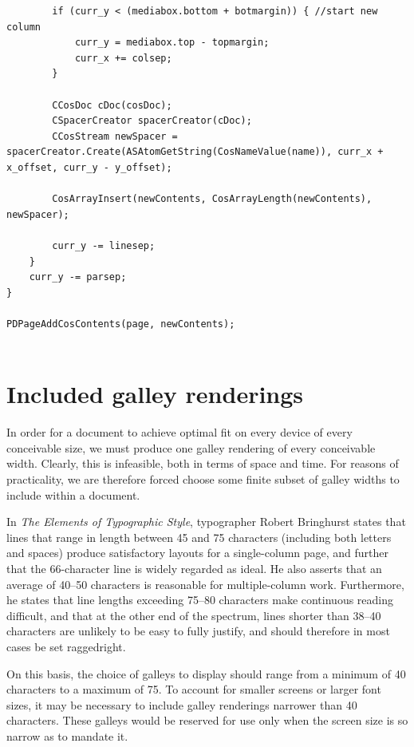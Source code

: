 \begin{lstlisting}
        if (curr_y < (mediabox.bottom + botmargin)) { //start new column
            curr_y = mediabox.top - topmargin;
            curr_x += colsep;
        }
        
        CCosDoc cDoc(cosDoc);
        CSpacerCreator spacerCreator(cDoc);
        CCosStream newSpacer = spacerCreator.Create(ASAtomGetString(CosNameValue(name)), curr_x + x_offset, curr_y - y_offset);
        
        CosArrayInsert(newContents, CosArrayLength(newContents), newSpacer);
        
        curr_y -= linesep;
    }
    curr_y -= parsep;
}

PDPageAddCosContents(page, newContents);


\end{lstlisting}


\section{Included galley renderings}
\label{sec:inc-renderings}
In order for a document to achieve optimal fit on every device of every conceivable size, we must produce one galley rendering of every conceivable width. Clearly, this is infeasible, both in terms of space and time. For reasons of practicality, we are therefore forced choose some finite subset of galley widths to include within a document.

In \emph{The Elements of Typographic Style},\cite{Bringhurst2008} typographer Robert Bringhurst states that lines that range in length between 45 and 75 characters (including both letters and spaces) produce satisfactory layouts for a single-column page, and further that the 66-character line is widely regarded as ideal. He also asserts that an average of 40--50 characters is reasonable for multiple-column work. Furthermore, he states that line lengths exceeding 75--80 characters make continuous reading difficult, and that at the other end of the spectrum, lines shorter than 38--40 characters are unlikely to be easy to fully justify, and should therefore in most cases be set \gls{raggedright}.

On this basis, the choice of galleys to display should range from a minimum of 40 characters to a maximum of 75. To account for smaller screens or larger font sizes, it may be necessary to include galley renderings narrower than 40 characters. These galleys would be reserved for use only when the screen size is so narrow as to mandate it.

